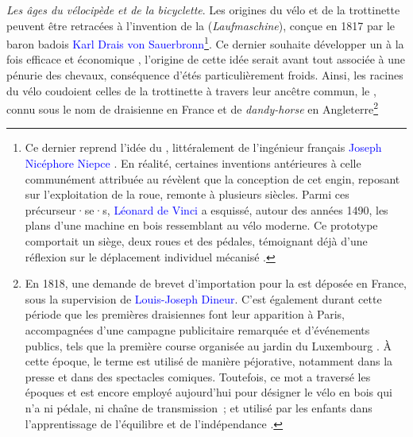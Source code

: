 \begin{refsegment}
\textsl{Les âges du vélocipède et de la bicyclette}. Les origines du vélo et de la trottinette peuvent être retracées à l’invention de la  (\textsl{Laufmaschine}), conçue en 1817 par le baron badois \textcolor{blue}{Karl Drais von Sauerbronn}\footnote{
    Ce dernier reprend l'idée du , littéralement  de l'ingénieur français \textcolor{blue}{Joseph Nicéphore Niepce} \textcolor{blue}{\autocite{puech_bicyclette_2016}}. En réalité, certaines inventions antérieures à celle communément attribuée au  révèlent que la conception de cet engin, reposant sur l’exploitation de la roue, remonte à plusieurs siècles. Parmi ces précurseur·se·s, \textcolor{blue}{Léonard de Vinci} a esquissé, autour des années 1490, les plans d’une machine en bois ressemblant au vélo moderne. Ce prototype comportait un siège, deux roues et des pédales, témoignant déjà d’une réflexion sur le déplacement individuel mécanisé \textcolor{blue}{\autocite[9]{hills_bicycle_2004}}.
}. Ce dernier souhaite développer un  à la fois efficace et économique \textcolor{blue}{\autocite[24]{heran_retour_2015}}, l’origine de cette idée serait avant tout associée à une pénurie des chevaux, conséquence d'étés particulièrement froids. Ainsi, les racines du vélo coudoient celles de la trottinette à travers leur ancêtre commun, le , connu sous le nom de draisienne en France et de \textsl{dandy-horse} en Angleterre\footnote{
    En 1818, une demande de brevet d'importation pour la  est déposée en France, sous la supervision de \textcolor{blue}{Louis-Joseph Dineur}. C’est également durant cette période que les premières draisiennes font leur apparition à Paris, accompagnées d’une campagne publicitaire remarquée et d’événements publics, tels que la première course organisée au jardin du Luxembourg \textcolor{blue}{\autocite[141]{kobayashi_histoire_1993}}. À cette époque, le terme  est utilisé de manière péjorative, notamment dans la presse et dans des spectacles comiques. Toutefois, ce mot a traversé les époques et est encore employé aujourd’hui pour désigner le vélo en bois qui n'a ni pédale, ni chaîne de transmission~; et utilisé par les enfants dans l’apprentissage de l’équilibre et de l’indépendance \textcolor{blue}{\autocite[21]{jouenne_quest-ce_2022}}.
}
\end{refsegment}
